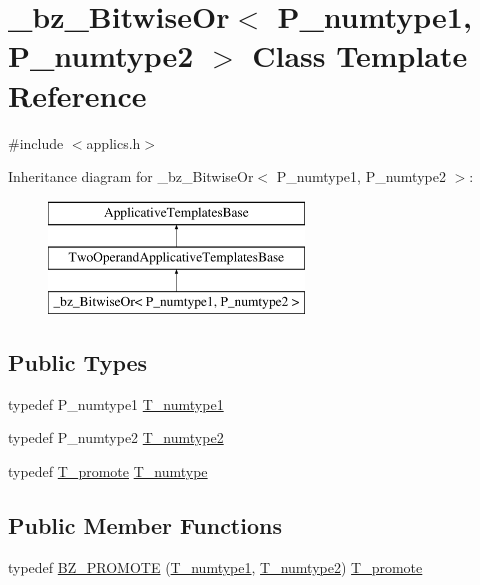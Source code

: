 \hypertarget{class__bz__BitwiseOr}{}\section{\+\_\+bz\+\_\+\+Bitwise\+Or$<$ P\+\_\+numtype1, P\+\_\+numtype2 $>$ Class Template Reference}
\label{class__bz__BitwiseOr}


{\ttfamily \#include $<$applics.\+h$>$}

Inheritance diagram for \+\_\+bz\+\_\+\+Bitwise\+Or$<$ P\+\_\+numtype1, P\+\_\+numtype2 $>$\+:\begin{figure}[H]
\begin{center}
\leavevmode
\includegraphics[height=3.000000cm]{class__bz__BitwiseOr}
\end{center}
\end{figure}
\subsection*{Public Types}
\begin{DoxyCompactItemize}
\item 
typedef P\+\_\+numtype1 \hyperlink{class__bz__BitwiseOr_ac6769776ff69e18eeeb02f3517826b07}{T\+\_\+numtype1}
\item 
typedef P\+\_\+numtype2 \hyperlink{class__bz__BitwiseOr_af866f1542575cb56448bb81cdda42465}{T\+\_\+numtype2}
\item 
typedef \hyperlink{minmax_8h_aaa88a440c2f0d00798d5b1d42c79308d}{T\+\_\+promote} \hyperlink{class__bz__BitwiseOr_a41e97d82dbf703b56b9195f292423a49}{T\+\_\+numtype}
\end{DoxyCompactItemize}
\subsection*{Public Member Functions}
\begin{DoxyCompactItemize}
\item 
typedef \hyperlink{class__bz__BitwiseOr_a9d43c35a29d3f6390b53df0e0ef70dd5}{B\+Z\+\_\+\+P\+R\+O\+M\+O\+T\+E} (\hyperlink{class__bz__BitwiseOr_ac6769776ff69e18eeeb02f3517826b07}{T\+\_\+numtype1}, \hyperlink{class__bz__BitwiseOr_af866f1542575cb56448bb81cdda42465}{T\+\_\+numtype2}) \hyperlink{minmax_8h_aaa88a440c2f0d00798d5b1d42c79308d}{T\+\_\+promote}
\end{DoxyCompactItemize}
